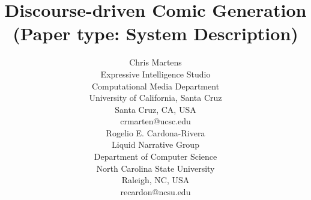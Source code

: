 \documentclass[letterpaper]{article}
\title{
        Discourse-driven Comic Generation
        \break
        {\small
	(Paper type: System Description)}
}
\author{
	Chris Martens\\
	Expressive Intelligence Studio\\
	Computational Media Department\\
	University of California, Santa Cruz\\
	Santa Cruz, CA, USA\\
	crmarten@ucsc.edu\\
	\And
	Rogelio E. Cardona-Rivera\\
	Liquid Narrative Group\\
	Department of Computer Science\\
	North Carolina State University\\
	Raleigh, NC, USA\\
	recardon@ncsu.edu\\
}
\begin{document}
 
\maketitle
\begin{abstract}
	\begin{quote}
	
	\end{quote}
\end{abstract}








% 
















\end{document}
